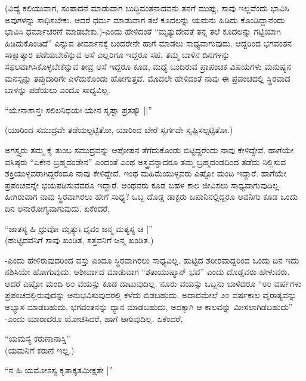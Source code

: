 (ವಿದ್ಯೆ ಕಲಿಯುವಾಗ, ಸಂಪಾದನೆ ಮಾಡುವಾಗ ಬುದ್ಧಿವಂತನಾದವನು ತನಗೆ ಮುಪ್ಪು, ಸಾವು ಇಲ್ಲವೆಂದು ಭಾವಿಸಿ ಅವುಗಳನ್ನು ಸಾಧಿಸಬೇಕು. ಆದರೆ ಧರ್ಮ ಮಾಡುವಾಗ ತಲೆ ಕೂದಲನ್ನು ಯಮನು ಹಿಡಿದು ಕೊಂಡಿದ್ದಾನೆಂದು ಭಾವಿಸಿ ಧರ್ಮಾಚರಣೆ ಮಾಡಬೇಕು.)-ಎಂದು ಹೇಳಿದಂತೆ ``ಮೃತ್ಯುದೇವತೆ ತನ್ನ ತಲೆ ಕೂದಲನ್ನು ಗಟ್ಟಿಯಾಗಿ ಹಿಡಿದುಕೊಂಡಿದೆ'' ಎನ್ನುವ ತೀರ್ಮಾನಕ್ಕೆ ಬಂದರೇನೇ ಹಾಗೆ ಮಾಡಲು ಸಾಧ್ಯವಾಗುವುದು. ಆದ್ದರಿಂದ ಭಗವಂತನ ಸಾಕ್ಷಾತ್ಕಾರ ಪಡೆಯಬೇಕೆನ್ನುವ ಆಸೆ ಎಲ್ಲರಿಗೂ ಇದ್ದರೂ ಸಹ, ತಮ್ಮ ಬಾಳಿನ ದಿನಗಳನ್ನು ಸಫಲವಾಗಿಸಿಕೊಳ್ಳಬೇಕೆನ್ನುವ ತೀವ್ರ ಆಸೆ ಇದ್ದರೂ ಕೂಡ, ಮಧ್ಯೆ ಬಂದಿರುವ ಪ್ರಾಪಂಚಿಕ ವಿಷಯಗಳು ಮನುಷ್ಯನ ಮನಸ್ಸನ್ನು ತಪ್ಪುದಾರಿಗೇ ಎಳೆದುಕೊಂಡು ಹೋಗುತ್ತವೆ. ಮೊದಲೇ ಹೇಳಿದಂತೆ ನಾವು ಈ ಪ್ರಪಂಚದಲ್ಲಿ ಸ್ಥಿರವಾದ ಬಾಳನ್ನು ಪಡೆಯಲು ಎಂದೂ ಸಾಧ್ಯವಿಲ್ಲ.

\begin{shloka}
``ಯೇನಾಶಾನ್ತಃ ಸಲಿಲನಿಧಯಃ ಯೇನ ಸೃಷ್ಟಾ ಪ್ರತತ್ಯೌ ||''
\end{shloka}

(ಯಾರಿಂದ ಸಮುದ್ರವೇ ತಡೆಯಲ್ಪಟ್ಟಿತೋ, ಯಾರಿಂದ ಬೇರೆ ಸ್ವರ್ಗವೇ ಸೃಷ್ಟಿಸಲ್ಪಟ್ಟಿತೋ.)

ಅಗಸ್ತ್ಯರು ತಮ್ಮ ಕೈ ತುಂಬ ಸಮುದ್ರವನ್ನು ಆಪೋಷನ ತೆಗೆದುಕೊಂಡು ಬಿಟ್ಟಿದ್ದರೆಂದು ನಾವು ಕೇಳಿದ್ದೇವೆ. ಹಾಗೆಯೇ ವಸಿಷ್ಠರು ``ಏಕೇನ ಬ್ರಹ್ಮದಂಡೇನ'' ಎಂದಂತೆ ಎಂಥ ಅಸ್ತ್ರವನ್ನಾದರೂ ತಮ್ಮ ಬ್ರಹ್ಮದಂಡದಿಂದ ತಡೆದು ನಿಲ್ಲಿಸುವ ಶಕ್ತಿಯುಳ್ಳವರಾಗಿದ್ದರೆಂದೂ ನಾವು ಕೇಳಿದ್ದೇವೆ. ಇಂಥ ಮಹಿಮೆಯುಳ್ಳವರು ಎಷ್ಟೋ ಮಂದಿ ಇದ್ದಾರೆ. ಹಾಗೆಯೇ ಪ್ರಪಂಚವನ್ನೇ ಭಯಪಡಿಸುವವರೂ ಇದ್ದಾರೆ. ಅಂಥವರು ಕೂಡ ಬಹಳ ಕಾಲ ಜೀವಿಸಲು ಸಾಧ್ಯವಾಗುವುದಿಲ್ಲ. ಹೀಗಿರುವಾಗ ನಾವು ಸ್ಥಿರವಾಗಿರಲು ಹೇಗೆ ಸಾಧ್ಯ? ಒಬ್ಬ ದೊಡ್ಡ ಡಾಕ್ಟರು ಜಪಾನಿನಲ್ಲಿದ್ದರೂ ಅವನಿಗು ಕೂಡ ಒಂದು ದಿನ ಅನಾರೋಗ್ಯವಾಗುವುದು. ಏಕೆಂದರೆ,

\begin{shloka}
``ಜಾತಸ್ಯ ಹಿ ಧ್ರುವೋ ಮೃತ್ಯುಃ ಧೃವಂ ಜನ್ಮ ಮತ್ಯಸ್ಯ ಚ |''\\
(ಹುಟ್ಟಿದವನಿಗೆ ಸಾವು ಖಂಡಿತ, ಸತ್ತವನಿಗೆ ಜನ್ಮ ಖಂಡಿತ.)
\end{shloka}

-ಎಂದು ಹೇಳಿರುವುದರಿಂದ ವಸ್ತು ಎಂದೂ ಸ್ಥಿರವಾಗಿರಲು ಸಾಧ್ಯವಿಲ್ಲ. ಹುಟ್ಟಿದ ಶರೀರವಾದ್ದರಿಂದ ಒಂದು ದಿನ ಇದು ನಶಿಸಿಯೇ ಹೋಗುವುದು. ಆಶೀರ್ವಾದ ಮಾಡುವಾಗ ``ಶತಾಯುಷ್ಮಾನ್ ಭವ'' ಎಂದು ದೊಡ್ಡವರು ಹೇಳುವರು. ಆದರೆ ಎಷ್ಟೋ ಮಂದಿ ೮೦ ವಯಸ್ಸು ಕೂಡ ದಾಟುವುದಿಲ್ಲ. ನೂರು ವಯಸ್ಸು ಒಬ್ಬನು ಬಾಳಿದರೂ ``೮೦ ವರ್ಷಗಳು ಪ್ರಪಂಚದಲ್ಲಿರುವುದನ್ನು ಅನುಭವಿಸುವುದರಲ್ಲಿ ಕಳೆದು ಬಿಡಬಹುದು. ಅದಾದಮೇಲೆ ೨೦ ವರ್ಷಕಾಲ ವೈರಾತ್ಯವನ್ನು ಅಭ್ಯಾಸ ಮಾಡಬಹುದು, ಭಗವಂತನನ್ನು ಧ್ಯಾನ ಮಾಡಬಹುದು, ಅದಕ್ಕಾಗಿ ಆ ಕಾಲವನ್ನು ಮೀಸಲಾಗಿಡಬಹುದು'' -ಎಂದು ಯಾರಾದರೂ ಯೋಚಿಸಿದರೆ, ಹಾಗೆ ಆಗುವುದಿಲ್ಲ. ಏಕೆಂದರೆ,

\begin{shloka}
``ಯಮಸ್ಯ ಕರುಣಾನಾಸ್ತಿ''\\
(ಯಮನಿಗೆ ಕರುಣೆ ಇಲ್ಲ.)
\end{shloka}

\begin{shloka}
``ನ ಹಿ ಯಮೋಽಸ್ಯ ಕೃತಾಕೃತಮೀಕ್ಷತೇ |''
\end{shloka}


